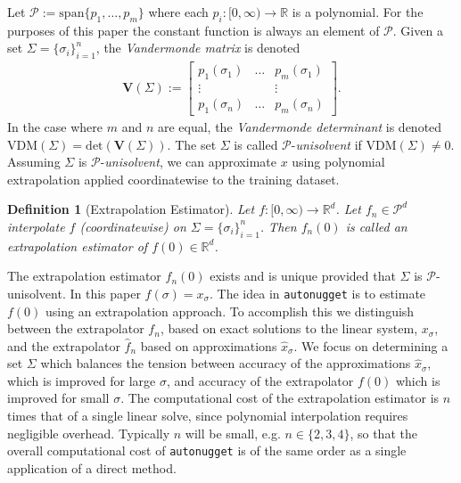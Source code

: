 \documentclass[10pt]{article} %
\newcommand{\nugget}{\sigma}
\newcommand{\nuggets}{\Sigma}
\newtheorem{definition}{Definition}
\begin{document}
Let $\mathcal{P} := \mathrm{span}\{p_1 , \dots , p_m\}$ where each $p_i : [0,\infty) \rightarrow \mathbb{R}$ is a polynomial.
For the purposes of this paper the constant function is always an element of $\mathcal{P}$.
Given a set $\nuggets = \{\nugget_i\}_{i=1}^n$, the \emph{Vandermonde matrix} is denoted
\begin{align*}
\mathbf{V}(\nuggets) := \left[ \begin{array}{ccc} p_1(\nugget_1) & \dots & p_m(\nugget_1) \\ \vdots & & \vdots \\ p_1(\nugget_n) & \dots & p_m(\nugget_n)
  \end{array} \right] .
\end{align*}
In the case where $m$ and $n$ are equal, the \emph{Vandermonde determinant} is denoted $\mathrm{VDM}(\nuggets) = \mathrm{det}(\mathbf{V}(\nuggets))$.
The set $\nuggets$ is called $\mathcal{P}$-\emph{unisolvent} if $\mathrm{VDM}(\nuggets) \neq 0$.
Assuming $\nuggets$ is $\mathcal{P}$-\emph{unisolvent}, we can approximate $x$ using polynomial extrapolation applied coordinatewise to the training dataset.

\begin{definition}[Extrapolation Estimator] \label{def: extrap estim}
Let $f : [0,\infty) \rightarrow \mathbb{R}^d$.
Let $f_n \in \mathcal{P}^d$ interpolate $f$ (coordinatewise) on $\nuggets = \{\nugget_i\}_{i=1}^n$.
Then $f_n(0)$ is called an \emph{extrapolation estimator} of $f(0) \in \mathbb{R}^d$.
\end{definition}

\noindent The extrapolation estimator $f_n(0)$ exists and is unique provided that $\nuggets$ is $\mathcal{P}$-unisolvent.
In this paper $f(\nugget) = x_\nugget$.
The idea in \texttt{autonugget} is to estimate $f(0)$ using an extrapolation approach.
To accomplish this we distinguish between the extrapolator $f_n$, based on exact solutions to the linear system, $x_\nugget$, and the extrapolator $\hat{f}_n$ based on approximations $\hat{x}_\nugget$.
We focus on determining a set $\nuggets$ which balances the tension between accuracy of the approximations $\hat{x}_\nugget$, which is improved for large $\nugget$, and accuracy of the extrapolator $f(0)$ which is improved for small $\nugget$. 
The computational cost of the extrapolation estimator is $n$ times that of a single linear solve, since polynomial interpolation requires negligible overhead.
Typically $n$ will be small, e.g. $n \in \{2,3,4\}$, so that the overall computational cost of \texttt{autonugget} is of the same order as a single application of a direct method.
\end{document}
